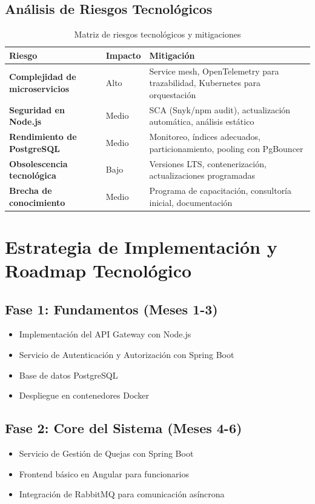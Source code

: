 \subsection{Análisis de Riesgos Tecnológicos}

\begin{table}[htbp]
\centering
\caption{Matriz de riesgos tecnológicos y mitigaciones}
\label{tab:riesgos}
\small
\begin{tabular}{|p{3.2cm}|p{2.5cm}|p{5cm}|}
\hline
\textbf{Riesgo} & \textbf{Impacto} & \textbf{Mitigación} \\
\hline
\textbf{Complejidad de microservicios} & Alto & Service mesh, OpenTelemetry para trazabilidad, Kubernetes para orquestación \\
\hline
\textbf{Seguridad en Node.js} & Medio & SCA (Snyk/npm audit), actualización automática, análisis estático \\
\hline
\textbf{Rendimiento de PostgreSQL} & Medio & Monitoreo, índices adecuados, particionamiento, pooling con PgBouncer \\
\hline
\textbf{Obsolescencia tecnológica} & Bajo & Versiones LTS, contenerización, actualizaciones programadas \\
\hline
\textbf{Brecha de conocimiento} & Medio & Programa de capacitación, consultoría inicial, documentación \\
\hline
\end{tabular}
\end{table}

\section{Estrategia de Implementación y Roadmap Tecnológico}

\subsection{Fase 1: Fundamentos (Meses 1-3)}
\begin{itemize}
    \item Implementación del API Gateway con Node.js
    \item Servicio de Autenticación y Autorización con Spring Boot
    \item Base de datos PostgreSQL
    \item Despliegue en contenedores Docker
\end{itemize}

\subsection{Fase 2: Core del Sistema (Meses 4-6)}
\begin{itemize}
    \item Servicio de Gestión de Quejas con Spring Boot
    \item Frontend básico en Angular para funcionarios
    \item Integración de RabbitMQ para comunicación asíncrona
\end{itemize}

